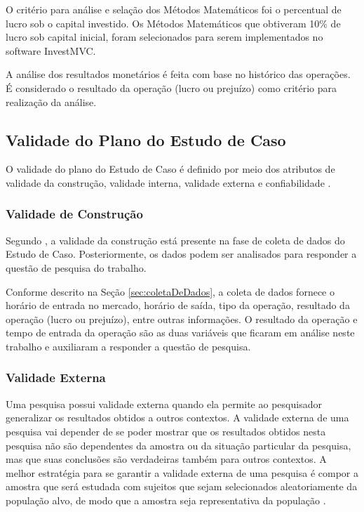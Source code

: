 O critério para análise e selação dos Métodos Matemáticos foi o percentual de lucro sob o capital investido. Os Métodos Matemáticos que obtiveram 10\% de lucro sob capital inicial, foram selecionados para serem implementados no software InvestMVC. 

A análise dos resultados monetários é feita com base no histórico das operações. É considerado o resultado da operação (lucro ou prejuízo) como critério para realização da análise.

\subsection{Validade do Plano do Estudo de Caso}

O validade do plano do Estudo de Caso é definido por meio dos atributos de validade da construção, validade interna, validade externa e confiabilidade \cite{brereton}.

\subsubsection {Validade de Construção}
Segundo , a validade da construção está presente na fase de coleta de dados do Estudo de Caso. Posteriormente, os dados podem ser analisados para responder a questão de pesquisa do trabalho.

Conforme descrito na Seção \ref{sec:coletaDeDados}, a coleta de dados fornece o horário de entrada no mercado, horário de saída, tipo da operação, resultado da operação (lucro ou prejuízo), entre outras informações. O resultado da operação e tempo de entrada da operação são as duas variáveis que ficaram em análise neste trabalho e auxiliaram a responder a questão de pesquisa.

\subsubsection{Validade Externa}
Uma pesquisa possui validade externa quando ela permite ao pesquisador generalizar os resultados obtidos a outros contextos. A validade externa de uma pesquisa vai depender de se poder mostrar que os resultados obtidos nesta pesquisa não são dependentes da amostra ou da situação particular da pesquisa, mas que suas conclusões são verdadeiras também para outros contextos. A melhor estratégia para se garantir a validade externa de uma pesquisa é compor a amostra que será estudada com sujeitos que sejam selecionados aleatoriamente da população alvo, de modo que a amostra seja representativa da população \cite{bandeira2012}.

